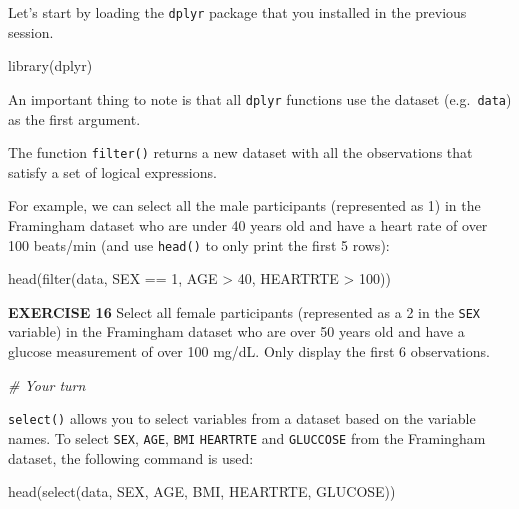 \documentclass[
]{article}
\newenvironment{Shaded}{\begin{snugshade}}{\end{snugshade}}
\newcommand{\CommentTok}[1]{\textcolor[rgb]{0.56,0.35,0.01}{\textit{#1}}}
\newcommand{\DecValTok}[1]{\textcolor[rgb]{0.00,0.00,0.81}{#1}}
\newcommand{\FunctionTok}[1]{\textcolor[rgb]{0.00,0.00,0.00}{#1}}
\newcommand{\NormalTok}[1]{#1}
\newcommand{\SpecialCharTok}[1]{\textcolor[rgb]{0.00,0.00,0.00}{#1}}
\begin{document}
Let's start by loading the \texttt{dplyr} package that you installed in
the previous session.

\begin{Shaded}
\begin{Highlighting}[]
\FunctionTok{library}\NormalTok{(dplyr)}
\end{Highlighting}
\end{Shaded}

An important thing to note is that all \texttt{dplyr} functions use the
dataset (e.g.~\texttt{data}) as the first argument.

The function \texttt{filter()} returns a new dataset with all the
observations that satisfy a set of logical expressions.

For example, we can select all the male participants (represented as 1)
in the Framingham dataset who are under 40 years old and have a heart
rate of over 100 beats/min (and use \texttt{head()} to only print the
first 5 rows):

\begin{Shaded}
\begin{Highlighting}[]
\FunctionTok{head}\NormalTok{(}\FunctionTok{filter}\NormalTok{(data, SEX }\SpecialCharTok{==} \DecValTok{1}\NormalTok{, AGE }\SpecialCharTok{\textgreater{}} \DecValTok{40}\NormalTok{, HEARTRTE }\SpecialCharTok{\textgreater{}} \DecValTok{100}\NormalTok{))}
\end{Highlighting}
\end{Shaded}

\textbf{EXERCISE 16} Select all female participants (represented as a 2
in the \texttt{SEX} variable) in the Framingham dataset who are over 50
years old and have a glucose measurement of over 100 mg/dL. Only display
the first 6 observations.

\begin{Shaded}
\begin{Highlighting}[]
\CommentTok{\# Your turn}
\end{Highlighting}
\end{Shaded}

\texttt{select()} allows you to select variables from a dataset based on
the variable names. To select \texttt{SEX}, \texttt{AGE}, \texttt{BMI}
\texttt{HEARTRTE} and \texttt{GLUCCOSE} from the Framingham dataset, the
following command is used:

\begin{Shaded}
\begin{Highlighting}[]
\FunctionTok{head}\NormalTok{(}\FunctionTok{select}\NormalTok{(data, SEX, AGE, BMI, HEARTRTE, GLUCOSE))}
\end{Highlighting}
\end{Shaded}
\end{document}
